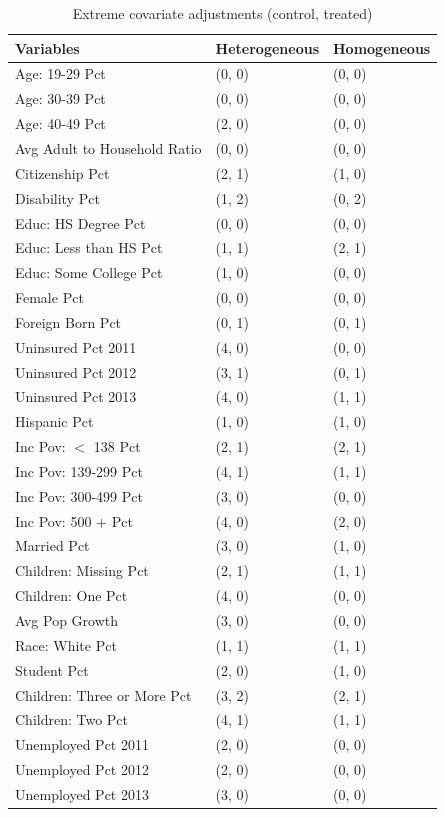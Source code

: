 \begin{table}[h!]
\centering
    \caption{Extreme covariate adjustments (control, treated)}
    \label{tab:extreme1}
\begin{tabular}{lll}
  \hline
Variables & Heterogeneous & Homogeneous \\ 
  \hline
Age: 19-29 Pct & (0, 0) & (0, 0) \\ 
  Age: 30-39 Pct & (0, 0) & (0, 0) \\ 
  Age: 40-49 Pct & (2, 0) & (0, 0) \\ 
  Avg Adult to Household Ratio & (0, 0) & (0, 0) \\ 
  Citizenship Pct & (2, 1) & (1, 0) \\ 
  Disability Pct & (1, 2) & (0, 2) \\ 
  Educ: HS Degree Pct & (0, 0) & (0, 0) \\ 
  Educ: Less than HS Pct & (1, 1) & (2, 1) \\ 
  Educ: Some College Pct & (1, 0) & (0, 0) \\ 
  Female Pct & (0, 0) & (0, 0) \\ 
  Foreign Born Pct & (0, 1) & (0, 1) \\ 
  Uninsured Pct 2011 & (4, 0) & (0, 0) \\ 
  Uninsured Pct 2012 & (3, 1) & (0, 1) \\ 
  Uninsured Pct 2013 & (4, 0) & (1, 1) \\ 
  Hispanic Pct & (1, 0) & (1, 0) \\ 
  Inc Pov: $<$ 138 Pct & (2, 1) & (2, 1) \\ 
  Inc Pov: 139-299 Pct & (4, 1) & (1, 1) \\ 
  Inc Pov: 300-499 Pct & (3, 0) & (0, 0) \\ 
  Inc Pov: 500 + Pct & (4, 0) & (2, 0) \\ 
  Married Pct & (3, 0) & (1, 0) \\ 
  Children: Missing Pct & (2, 1) & (1, 1) \\ 
  Children: One Pct & (4, 0) & (0, 0) \\ 
  Avg Pop Growth & (3, 0) & (0, 0) \\ 
  Race: White Pct & (1, 1) & (1, 1) \\ 
  Student Pct & (2, 0) & (1, 0) \\ 
  Children: Three or More Pct & (3, 2) & (2, 1) \\ 
  Children: Two Pct & (4, 1) & (1, 1) \\ 
  Unemployed Pct 2011 & (2, 0) & (0, 0) \\ 
  Unemployed Pct 2012 & (2, 0) & (0, 0) \\ 
  Unemployed Pct 2013 & (3, 0) & (0, 0) \\ 
   \hline
\end{tabular}
\end{table}

